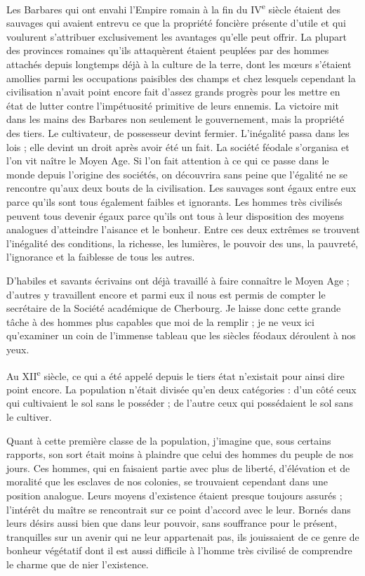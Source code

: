 \documentclass[french,twoside]{book} %
\begin{document}
Les Barbares qui ont envahi l’Empire romain à la fin du IV\textsuperscript{e} siècle étaient des sauvages qui avaient entrevu ce que la propriété foncière présente d’utile et qui voulurent s’attribuer exclusivement les avantages qu’elle peut offrir. La plupart des provinces romaines qu’ils attaquèrent étaient peuplées par des hommes attachés depuis longtemps déjà à la culture de la terre, dont les mœurs s’étaient amollies parmi les occupations paisibles des champs et chez lesquels cependant la civilisation n’avait point encore fait d’assez grands progrès pour les mettre en état de lutter contre l’impétuosité primitive de leurs ennemis. La victoire mit dans les mains des Barbares non seulement le gouvernement, mais la propriété des tiers. Le cultivateur, de possesseur devint fermier. L'inégalité passa dans les lois ; elle devint un droit après avoir été un fait. La société féodale s’organisa et l’on vit naître le Moyen Age. Si l’on fait attention à ce qui ce passe dans le monde depuis l’origine des sociétés, on découvrira sans peine que l’égalité ne se rencontre qu’aux deux bouts de la civilisation. Les sauvages sont égaux entre eux parce qu’ils sont tous également faibles et ignorants. Les hommes très civilisés peuvent tous devenir égaux parce qu’ils ont tous à leur disposition des moyens analogues d’atteindre l’aisance et le bonheur. Entre ces deux extrêmes se trouvent l’inégalité des conditions, la richesse, les lumières, le pouvoir des uns, la pauvreté, l’ignorance et la faiblesse de tous les autres.\par
D'habiles et savants écrivains ont déjà travaillé à faire connaître le Moyen Age ; d’autres y travaillent encore et parmi eux il nous est permis de compter le secrétaire de la Société académique de Cherbourg. Je laisse donc cette grande tâche à des hommes plus capables que moi de la remplir ; je ne veux ici qu’examiner un coin de l’immense tableau que les siècles féodaux déroulent à nos yeux.\par
Au XII\textsuperscript{e} siècle, ce qui a été appelé depuis le tiers état n’existait pour ainsi dire point encore. La population n’était divisée qu’en deux catégories : d’un côté ceux qui cultivaient le sol sans le posséder ; de l’autre ceux qui possédaient le sol sans le cultiver.\par
Quant à cette première classe de la population, j’imagine que, sous certains rapports, son sort était moins à plaindre que celui des hommes du peuple de nos jours. Ces hommes, qui en faisaient partie avec plus de liberté, d’élévation et de moralité que les esclaves de nos colonies, se trouvaient cependant dans une position analogue. Leurs moyens d’existence étaient presque toujours assurés ; l’intérêt du maître se rencontrait sur ce point d’accord avec le leur. Bornés dans leurs désirs aussi bien que dans leur pouvoir, sans souffrance pour le présent, tranquilles sur un avenir qui ne leur appartenait pas, ils jouissaient de ce genre de bonheur végétatif dont il est aussi difficile à l’homme très civilisé de comprendre le charme que de nier l’existence.\par
\end{document}
